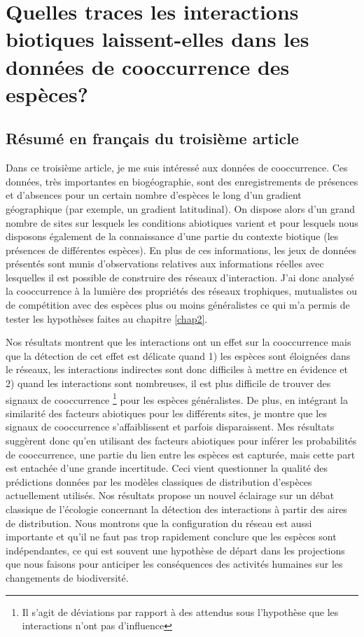 \chapter{Quelles traces les interactions biotiques laissent-elles dans les données de cooccurrence des espèces?}
\label{chap3}

\section{Résumé en français du troisième article}

Dans ce troisième article, je me suis intéressé aux données de cooccurrence.
Ces données, très importantes en biogéographie, sont des enregistrements
de présences et d'absences pour un certain nombre d'espèces
le long d'un gradient géographique (par exemple, un gradient latitudinal).
On dispose alors d’un grand nombre de sites sur lesquels les conditions abiotiques
varient et pour lesquels nous disposons également de la connaissance
d’une partie du contexte biotique (les présences de différentes espèces).
En plus de ces informations, les jeux de données présentés sont munis
d’observations relatives aux informations réelles avec lesquelles il est possible
de construire des réseaux d'interaction. J'ai donc analysé la cooccurrence à la
lumière des propriétés des réseaux trophiques, mutualistes ou de compétition
avec des espèces plus ou moins généralistes ce qui m’a permis de tester les
hypothèses faites au chapitre \ref{chap2}.


Nos résultats montrent que les interactions ont un effet sur la cooccurrence
mais que la détection de cet effet est délicate quand 1) les espèces sont éloignées
dans le réseaux, les interactions indirectes sont donc difficiles à mettre en
évidence et 2) quand les interactions sont nombreuses, il est plus
difficile de trouver des signaux de cooccurrence \footnote{Il s'agit de
déviations par rapport à des attendus sous l'hypothèse que les interactions
n'ont pas d'influence} pour les espèces généralistes. De plus, en intégrant
la similarité des facteurs abiotiques pour les différents sites, je montre que
les signaux de cooccurrence s’affaiblissent et parfois disparaissent. Mes
résultats suggèrent donc qu’en utilisant des facteurs abiotiques pour
inférer les probabilités de cooccurrence, une partie du lien entre les espèces
est capturée, mais cette part est entachée d’une grande incertitude. Ceci vient
questionner la qualité des prédictions données par les modèles classiques de
distribution d'espèces actuellement utilisés. Nos résultats propose un nouvel
éclairage sur un débat classique de l'écologie concernant la détection
des interactions à partir des aires de distribution. Nous montrons que la
configuration du réseau est aussi importante et qu’il ne faut pas trop
rapidement conclure que les espèces sont indépendantes, ce qui est souvent une
hypothèse de départ dans les projections que nous faisons pour anticiper
les conséquences des activités humaines sur les changements de biodiversité.



